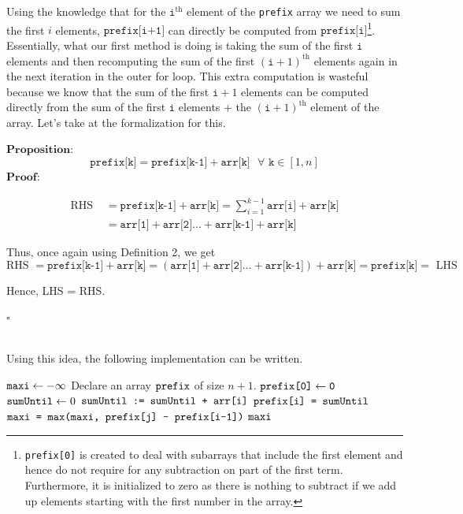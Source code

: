 \noindent Using the knowledge that for the $\texttt{i}^\text{th}$ element of the \texttt{prefix} array we need to sum the first $i$ elements, $\texttt{prefix[i+1]}$ can directly be computed from $\texttt{prefix[i]}$\footnote{\texttt{prefix[0]} is created to deal with subarrays that include the first element and hence do not require for any subtraction on part of the first term. Furthermore, it is initialized to zero as there is nothing to subtract if we add up elements starting with the first number in the array.}. Essentially, what our first method is doing is taking the sum of the first $\texttt{i}$ elements and then recomputing the sum of the first $(\texttt{i}+1)^{\text{th}}$ elements again in the next iteration in the outer for loop. This extra computation is wasteful because we know that the sum of the first $\texttt{i}+1$ elements can be computed directly from the sum of the first $\texttt{i}$ elements + the $(\texttt{i}+1)^{\text{th}}$ element of the array. Let's take at the formalization for this. \newline 

\noindent $\textbf{Proposition:}$
$$\texttt{prefix[k]} = \texttt{prefix[k-1]} + \texttt{arr[k]} \text{   } \forall \texttt{ k} \in [1, n]$$
\noindent $\textbf{Proof:}$

\begin{align*} 
\text{RHS } &= \texttt{prefix[k-1]} + \texttt{arr[k]}= \sum_{i=1}^{k-1} \texttt{arr[i]} + \texttt{arr[k]} \\ 
 &=  \texttt{arr[1]} + \texttt{arr[2]} \dots + \texttt{arr[k-1]} + \texttt{arr[k]}
\end{align*}

Thus, once again using Definition 2, we get $$\text{RHS } = \texttt{prefix[k-1]} + \texttt{arr[k]} = (\texttt{arr[1]} + \texttt{arr[2]} \dots + \texttt{arr[k-1]}) + \texttt{arr[k]} = \texttt{prefix[k]} = \text{ LHS}$$

Hence, LHS = RHS.

\noindent $\square$

\noindent \\ Using this idea, the following implementation can be written. 

\begin{algorithm}
\caption{}\label{prefix}
\begin{algorithmic}[1]
\State $\texttt{maxi} \gets -\infty$ 
\State Declare an array $\texttt{prefix}$ of size $n+1$.
\State $\texttt{prefix[0]} \gets \texttt{0}$ 
\State $\texttt{sumUntil} \gets 0$
    \State $\texttt{sumUntil := sumUntil + arr[i]}$
    \State $\texttt{prefix[i] = sumUntil}$
\EndFor
{}
        \State $\texttt{maxi = max(maxi, prefix[j] - prefix[i-1])}$
    \EndFor
\EndFor 
\State \Return $\texttt{maxi}$
\end{algorithmic}
\end{algorithm}

